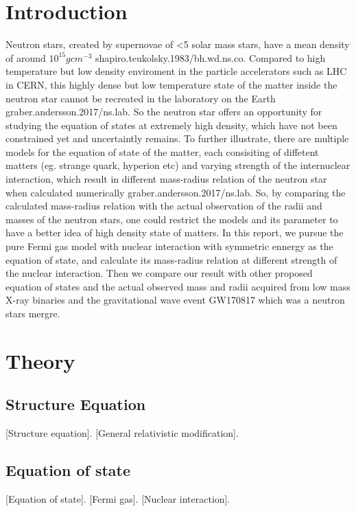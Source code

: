 \documentclass[11pt]{article}
\begin{document}
\section{Introduction}
Neutron stars, created by supernovae of <5 solar mass stars, have a mean density of around $10^{15} gcm^{-3}$ {shapiro.teukolsky.1983/bh.wd.ns.co}. Compared to high temperature but low density enviroment in the particle accelerators such as LHC in CERN, this highly dense but low temperature state of the matter inside the neutron star cannot be recreated in the laboratory on the Earth {graber.andersson.2017/ns.lab}. So the neutron star offers an opportunity for studying the equation of states at extremely high density, which have not been constrained yet and uncertaintly remains.  
To further illustrate, there are multiple models for the equation of state of the matter, each consisiting of diffetent matters (eg. strange quark, hyperion etc) and varying strength of the internuclear interaction, which result in different mass-radius relation of the neutron star when calculated numerically {graber.andersson.2017/ns.lab}. So, by comparing the calculated mass-radius relation with the actual observation of the radii and masses of the neutron stars, one could restrict the models and its parameter to have a better idea of high density state of matters.
In this report, we pursue the pure Fermi gas model with nuclear interaction with symmetric ennergy as the equation of state, and calculate its mass-radius relation at different strength of the nuclear interaction. Then we compare our result with other proposed equation of states and the actual observed mass and radii acquired from low mass X-ray binaries and the gravitational wave event GW170817 which was a neutron stars mergre.
\label{intro}


\section{Theory}

\subsection{Structure Equation }
[Structure equation]. [General relativistic modification]. 
\subsection{Equation of state}
[Equation of state]. [Fermi gas]. [Nuclear interaction].
\end{document}
